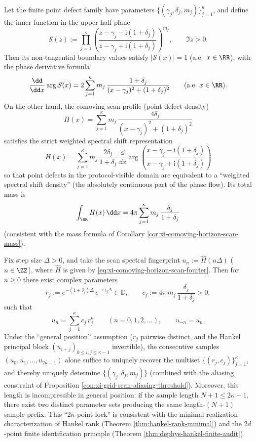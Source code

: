 \begin{proposition}\label{con:xi-spectral-shift-phase-density}
Let the finite point defect family have parameters \(\{(\gamma_j,\delta_j,m_j)\}_{j=1}^{\kappa}\), and define the inner function in the upper half-plane
\[
\mathcal{S}(z)
:=
\prod_{j=1}^{\kappa}
\left(
\frac{z-\gamma_j-\mathrm{i}(1+\delta_j)}{z-\gamma_j+\mathrm{i}(1+\delta_j)}
\right)^{m_j},
\qquad \Im z>0.
\]
Then its non-tangential boundary values satisfy \(|\mathcal{S}(x)|=1\) (a.e.\ \(x\in\RR\)), with the phase derivative formula
\[
\frac{\dd}{\dd x}\arg \mathcal{S}(x)
=
2\sum_{j=1}^{\kappa}m_j\,\frac{1+\delta_j}{(x-\gamma_j)^2+(1+\delta_j)^2}
\qquad\text{(a.e.\ \(x\in\RR\))}.
\]
On the other hand, the comoving scan profile (point defect density)
\[
H(x)
=
\sum_{j=1}^{\kappa}m_j\,\frac{4\delta_j}{(x-\gamma_j)^2+(1+\delta_j)^2}
\]
satisfies the strict weighted spectral shift representation
\[
\boxed{\;
H(x)
=
\sum_{j=1}^{\kappa}m_j\,\frac{2\delta_j}{1+\delta_j}\,
\frac{\dd}{\dd x}\arg\!\left(
\frac{x-\gamma_j-\mathrm{i}(1+\delta_j)}{x-\gamma_j+\mathrm{i}(1+\delta_j)}
\right)
\;}
\]
so that point defects in the protocol-visible domain are equivalent to a ``weighted spectral shift density'' (the absolutely continuous part of the phase flow).
Its total mass is
\[
\int_{\RR}H(x)\,\dd x
=
4\pi\sum_{j=1}^{\kappa}m_j\,\frac{\delta_j}{1+\delta_j}
\]
(consistent with the mass formula of Corollary \ref{cor:xi-comoving-horizon-scan-mass}).
\end{proposition}

\begin{proposition}\label{con:xi-2kappa-minimal-complete-samples}
Fix step size \(\Delta>0\), and take the scan spectral fingerprint
\(
u_n:=\widehat H(n\Delta)
\)
(\(n\in\ZZ\)), where \(\widehat H\) is given by \eqref{eq:xi-comoving-horizon-scan-fourier}.
Then for \(n\ge 0\) there exist complex parameters
\[
r_j:=e^{-(1+\delta_j)\Delta}\,e^{-\mathrm{i}\gamma_j\Delta}\in\mathbb{D},
\qquad
c_j:=4\pi\,m_j\,\frac{\delta_j}{1+\delta_j}>0,
\]
such that
\[
u_n=\sum_{j=1}^{\kappa}c_j\,r_j^{n}\qquad(n=0,1,2,\dots),
\qquad
u_{-n}=\overline{u_n}.
\]
Under the ``general position'' assumption (\(r_j\) pairwise distinct, and the Hankel principal block \((u_{i+j})_{0\le i,j\le \kappa-1}\) invertible), the consecutive samples
\(
(u_0,u_1,\dots,u_{2\kappa-1})
\)
alone suffice to uniquely recover the multiset \(\{(r_j,c_j)\}_{j=1}^{\kappa}\), and thereby uniquely determine \(\{(\gamma_j,\delta_j,m_j)\}\) (combined with the aliasing constraint of Proposition \ref{con:xi-grid-scan-aliasing-threshold}).
Moreover, this length is incompressible in general position: if the sample length \(N+1\le 2\kappa-1\), there exist two distinct parameter sets producing the same length-\((N+1)\) sample prefix.
This ``\(2\kappa\)-point lock'' is consistent with the minimal realization characterization of Hankel rank (Theorem \ref{thm:hankel-rank-minimal}) and the \(2d\)-point finite identification principle (Theorem \ref{thm:dephys-hankel-finite-audit}).
\end{proposition}

